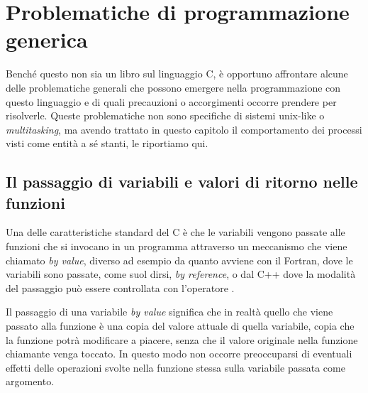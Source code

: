 





\section{Problematiche di programmazione generica}
\label{sec:proc_gen_prog}

Benché questo non sia un libro sul linguaggio C, è opportuno affrontare alcune
delle problematiche generali che possono emergere nella programmazione con
questo linguaggio e di quali precauzioni o accorgimenti occorre prendere per
risolverle. Queste problematiche non sono specifiche di sistemi unix-like o
\textit{multitasking}, ma avendo trattato in questo capitolo il comportamento
dei processi visti come entità a sé stanti, le riportiamo qui.


\subsection{Il passaggio di variabili e valori di ritorno nelle funzioni}
\label{sec:proc_var_passing}

Una delle caratteristiche standard del C è che le variabili vengono passate
alle funzioni che si invocano in un programma attraverso un meccanismo che
viene chiamato \textit{by value}, diverso ad esempio da quanto avviene con il
Fortran, dove le variabili sono passate, come suol dirsi, \textit{by
  reference}, o dal C++ dove la modalità del passaggio può essere controllata
con l'operatore \cmd{\&}.

Il passaggio di una variabile \textit{by value} significa che in realtà quello
che viene passato alla funzione è una copia del valore attuale di quella
variabile, copia che la funzione potrà modificare a piacere, senza che il
valore originale nella funzione chiamante venga toccato. In questo modo non
occorre preoccuparsi di eventuali effetti delle operazioni svolte nella
funzione stessa sulla variabile passata come argomento.

